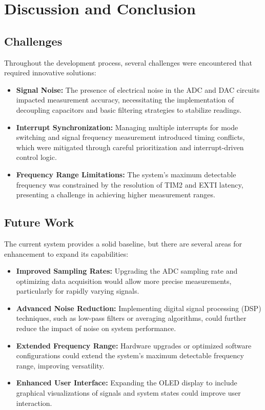 \section{Discussion and Conclusion}
\subsection{Challenges}
Throughout the development process, several challenges were encountered that required innovative solutions:  
\begin{itemize}[leftmargin=2em]
    \item \textbf{Signal Noise:} The presence of electrical noise in the ADC and DAC circuits impacted measurement accuracy, necessitating the implementation of decoupling capacitors and basic filtering strategies to stabilize readings.
    \item \textbf{Interrupt Synchronization:} Managing multiple interrupts for mode switching and signal frequency measurement introduced timing conflicts, which were mitigated through careful prioritization and interrupt-driven control logic.
    \item \textbf{Frequency Range Limitations:} The system's maximum detectable frequency was constrained by the resolution of TIM2 and EXTI latency, presenting a challenge in achieving higher measurement ranges.
\end{itemize}

\subsection{Future Work}
The current system provides a solid baseline, but there are several areas for enhancement to expand its capabilities:
\begin{itemize}[leftmargin=2em]
    \item \textbf{Improved Sampling Rates:} Upgrading the ADC sampling rate and optimizing data acquisition would allow more precise measurements, particularly for rapidly varying signals.
    \item \textbf{Advanced Noise Reduction:} Implementing digital signal processing (DSP) techniques, such as low-pass filters or averaging algorithms, could further reduce the impact of noise on system performance.
    \item \textbf{Extended Frequency Range:} Hardware upgrades or optimized software configurations could extend the system's maximum detectable frequency range, improving versatility.
    \item \textbf{Enhanced User Interface:} Expanding the OLED display to include graphical visualizations of signals and system states could improve user interaction.
\end{itemize}

